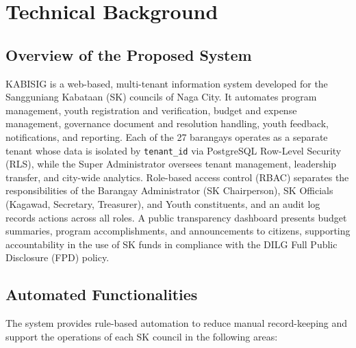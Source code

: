 \chapter{Technical Background}
\label{chap:technical_background}

\section{Overview of the Proposed System}
\label{sec:overview_of_the_proposed_system}

\hspace*{\parindent}KABISIG is a web-based, multi-tenant information system developed for the Sangguniang Kabataan (SK) councils of Naga City. It automates program management, youth registration and verification, budget and expense management, governance document and resolution handling, youth feedback, notifications, and reporting. Each of the 27 barangays operates as a separate tenant whose data is isolated by \texttt{tenant\_id} via PostgreSQL Row-Level Security (RLS), while the Super Administrator oversees tenant management, leadership transfer, and city-wide analytics. Role-based access control (RBAC) separates the responsibilities of the Barangay Administrator (SK Chairperson), SK Officials (Kagawad, Secretary, Treasurer), and Youth constituents, and an audit log records actions across all roles. A public transparency dashboard presents budget summaries, program accomplishments, and announcements to citizens, supporting accountability in the use of SK funds in compliance with the DILG Full Public Disclosure (FPD) policy.
\vspace{5mm}

\section{Automated Functionalities}
\label{sec:automated_functionalities}

\hspace*{\parindent}The system provides rule-based automation to reduce manual record-keeping and support the operations of each SK council in the following areas:

